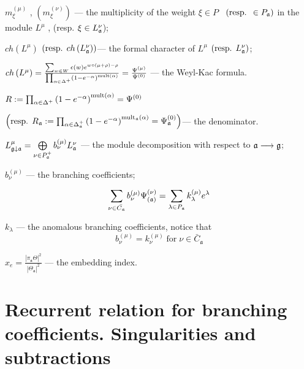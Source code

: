 \documentclass[12pt]{iopart}
\begin{document}
$m_{\xi }^{\left( \mu \right) }$ , $\left( m_{\xi }^{\left( \nu \right)
}\right) $ --- the multiplicity of the weight $\xi \in P$ \ $\left( \mbox{%
resp. }\in P_{\frak{a}}\right) $ in the module $L^{\mu }$ , (resp. $\xi \in
L_{\frak{a}}^{\nu } $);

$ch\left( L^{\mu }\right) $ $\left( \mbox{resp. }ch\left( L_{\frak{a}}^{\nu
}\right) \right) $--- the formal character of $L^{\mu }$ $\left( \mbox{resp. }%
L_{\frak{a}}^{\nu }\right) $;

$ch\left( L^{\mu }\right) =\frac{\sum_{w\in W}\epsilon (w)e^{w\circ (\mu
+\rho )-\rho }}{\prod_{\alpha \in \Delta ^{+}}\left( 1-e^{-\alpha }\right) ^{%
\mathrm{{mult}\left( \alpha \right) }}}=\frac{\Psi ^{\left( \mu \right) }}{%
\Psi ^{\left( 0\right) }}$ --- the Weyl-Kac formula.

$R:=\prod_{\alpha \in \Delta ^{+}}\left( 1-e^{-\alpha }\right) ^{\mathrm{{%
mult}\left( \alpha \right) }}=\Psi ^{\left( 0\right) }\quad $

\noindent $\left( \mbox{resp. }R_{\frak{a}}:=\prod_{\alpha \in \Delta _{%
\frak{a}}^{+}}\left( 1-e^{-\alpha }\right) ^{\mathrm{mult}_{\frak{a}}\mathrm{%
\left( \alpha \right) }}=\Psi _{\frak{a}}^{\left( 0\right) }\right) $--- the
denominator.

$  L_{\frak{g}\downarrow \frak{a}}^{\mu }=\bigoplus\limits_{\nu \in P_{\frak{a}}^{+}}b_{\nu }^{\left( \mu \right) }L_{\frak{a}}^{\nu }$ --- the module decomposition with respect to $\frak{a}\longrightarrow \frak{g}$;


$b^{(\mu)}_{\nu}$ --- the branching coefficients;

\begin{equation}
  \label{eq:21}
  \sum_{\nu \in \bar{C_{\mathfrak{a}}}}b_{\nu }^{\left( \mu \right) }\Psi _{\left( \frak{%
        a}\right) }^{\left( \nu \right) }=\sum_{\lambda \in P_{\frak{a}}}k_{\lambda
  }^{\left( \mu \right) }e^{\lambda }
\end{equation}

 $k_{\lambda}$ --- the anomalous branching coefficients, notice that
\begin{equation}
  \label{eq:20}
  b^{(\mu)}_{\nu}=k^{(\mu)}_{\nu} \; \mbox{for} \; \nu\in \bar{C}_{\mathfrak{a}}
\end{equation}

$x_e=\frac{\left|\pi_{\mathfrak{a}} \Theta\right|^2}{\left|\Theta_{\mathfrak{a}}\right|^2}$ --- the embedding index.

\section{Recurrent relation for branching coefficients. Singularities and subtractions}
\label{sec:recurr-form-branch}
\end{document}
